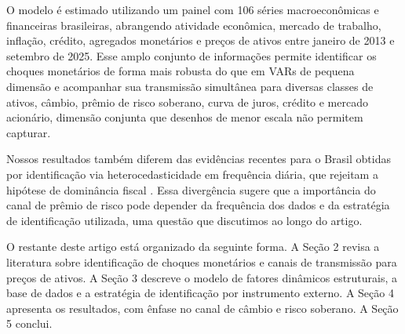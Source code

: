 \documentclass[preprint,authoryear,review,12pt]{elsarticle}
\begin{document}
O modelo é estimado utilizando um painel com 106 séries macroeconômicas e financeiras brasileiras, abrangendo atividade econômica, mercado de trabalho, inflação, crédito, agregados monetários e preços de ativos entre janeiro de 2013 e setembro de 2025. Esse amplo conjunto de informações permite identificar os choques monetários de forma mais robusta do que em VARs de pequena dimensão e acompanhar sua transmissão simultânea para diversas classes de ativos, câmbio, prêmio de risco soberano, curva de juros, crédito e mercado acionário, dimensão conjunta que desenhos de menor escala não permitem capturar.

Nossos resultados também diferem das evidências recentes para o Brasil obtidas por identificação via heterocedasticidade em frequência diária, que rejeitam a hipótese de dominância fiscal \cite{goncalves2025}. Essa divergência sugere que a importância do canal de prêmio de risco pode depender da frequência dos dados e da estratégia de identificação utilizada, uma questão que discutimos ao longo do artigo.

O restante deste artigo está organizado da seguinte forma. A Seção 2 revisa a literatura sobre identificação de choques monetários e canais de transmissão para preços de ativos. A Seção 3 descreve o modelo de fatores dinâmicos estruturais, a base de dados e a estratégia de identificação por instrumento externo. A Seção 4 apresenta os resultados, com ênfase no canal de câmbio e risco soberano. A Seção 5 conclui.


\end{document}
